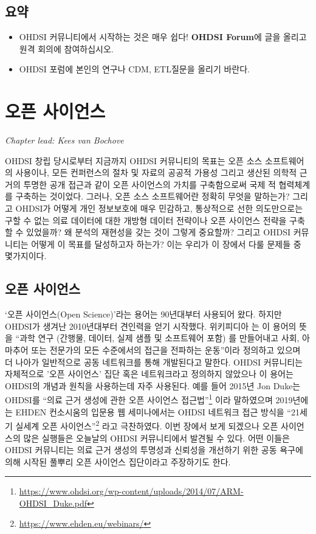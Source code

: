 \documentclass[11pt]{book}
\let\rmarkdownfootnote\footnote%
\def\footnote{\protect\rmarkdownfootnote}
\theoremstyle{definition}
\theoremstyle{definition}
\theoremstyle{definition}
\theoremstyle{remark}
\let\BeginKnitrBlock\begin \let\EndKnitrBlock\end
\begin{document}
\section{요약}\label{-1}

\BeginKnitrBlock{rmdsummary}
\begin{itemize}
\item
  OHDSI 커뮤니티에서 시작하는 것은 매우 쉽다! \textbf{OHDSI Forum}에
  글을 올리고 원격 회의에 참여하십시오.
\item
  OHDSI 포럼에 본인의 연구나 CDM, ETL질문을 올리기 바란다.
\end{itemize}
\EndKnitrBlock{rmdsummary}

\chapter{오픈 사이언스}\label{OpenScience}


\emph{Chapter lead: Kees van Bochove}

OHDSI 창립 당시로부터 지금까지 OHDSI 커뮤니티의 목표는 오픈 소스
소프트웨어의 사용이나, 모든 컨퍼런스의 절차 및 자료의 공공적 가용성
그리고 생산된 의학적 근거의 투명한 공개 접근과 같이 오픈 사이언스의
가치를 구축함으로써 국제 적 협력체계를 구축하는 것이었다. 그러나, 오픈
소스 소프트웨어란 정확히 무엇을 말하는가? 그리고 OHDSI가 어떻게 개인
정보보호에 매우 민감하고, 통상적으로 선한 의도만으로는 구할 수 없는 의료
데이터에 대한 개방형 데이터 전략이나 오픈 사이언스 전략을 구축할 수
있었을까? 왜 분석의 재현성을 갖는 것이 그렇게 중요할까? 그리고 OHDSI
커뮤니티는 어떻게 이 목표를 달성하고자 하는가? 이는 우리가 이 장에서
다룰 문제들 중 몇가지이다.

\section{오픈 사이언스}\label{-}

`오픈 사이언스(Open Science)'라는 용어는 90년대부터 사용되어 왔다.
하지만 OHDSI가 생겨난 2010년대부터 견인력을 얻기 시작했다. 위키피디아
\citep{wiki:Open_science} 는 이 용어의 뜻을 ``과학 연구 (간행물, 데이터,
실제 샘플 및 소프트웨어 포함) 를 만들어내고 사회, 아마추어 또는 전문가의
모든 수준에서의 접근을 전파하는 운동''이라 정의하고 있으며 더 나아가
일반적으로 공동 네트워크를 통해 개발된다고 말한다. OHDSI 커뮤니티는
자체적으로 '오픈 사이언스' 집단 혹은 네트워크라고 정의하지 않았으나 이
용어는 OHDSI의 개념과 원칙을 사용하는데 자주 사용된다. 예를 들어 2015년
Jon Duke는 OHDSI를 ``의료 근거 생성에 관한 오픈 사이언스
접근법''\footnote{\url{https://www.ohdsi.org/wp-content/uploads/2014/07/ARM-OHDSI_Duke.pdf}}
이라 말하였으며 2019년에는 EHDEN 컨소시움의 입문용 웹 세미나에서는 OHDSI
네트워크 접근 방식을 ``21세기 실세계 오픈 사이언스''\footnote{\url{https://www.ehden.eu/webinars/}}
라고 극찬하였다. 이번 장에서 보게 되겠으나 오픈 사이언스의 많은 실행들은
오늘날의 OHDSI 커뮤니티에서 발견될 수 있다. 어떤 이들은 OHDSI 커뮤니티는
의료 근거 생성의 투명성과 신뢰성을 개선하기 위한 공동 욕구에 의해 시작된
풀뿌리 오픈 사이언스 집단이라고 주장하기도 한다.
\end{document}
